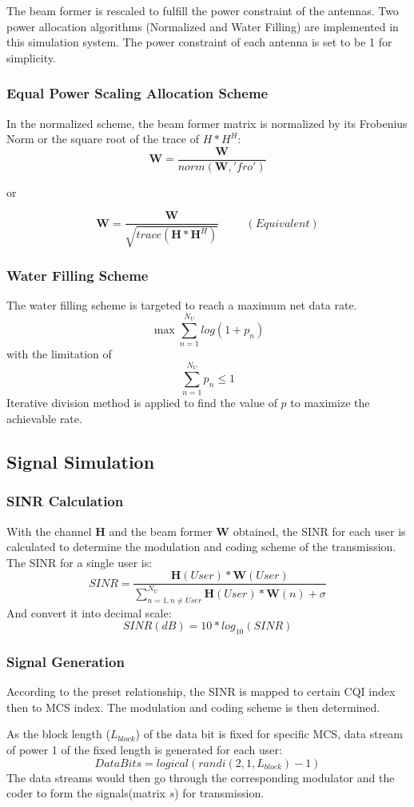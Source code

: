 \documentclass{article}
\begin{document}
The beam former is rescaled to fulfill the power constraint of the antennas. Two power allocation algorithms (Normalized and Water Filling) are implemented in this simulation system.
The power constraint of each antenna is set to be 1 for simplicity.
\subsubsection{Equal Power Scaling Allocation Scheme}
In the normalized scheme, the beam former matrix is normalized by its Frobenius Norm or the square root of the trace of $H*H^H$:
$$
\textbf{W} = \frac{\textbf{W}}{norm(\textbf{W}, 'fro')}
$$
\begin{center}or\end{center}
$$
\textbf{W} = \frac{\textbf{W}}{\sqrt{trace(\textbf{H}*\textbf{H}^H)}}   \hspace{1cm}(Equivalent)
$$
\subsubsection{Water Filling Scheme}
The water filling scheme is targeted to reach a maximum net data rate.
$$
\max \sum_{n=1}^{N_U} log(1+p_n)
$$
with the limitation of
$$\sum_{n=1}^{N_U} p_n \leq 1$$
Iterative division method is applied to find the value of $p$ to maximize the achievable rate.

\subsection{Signal Simulation}
\subsubsection{SINR Calculation}
With the channel \textbf{H} and the beam former \textbf{W} obtained, the SINR for each user is calculated to determine the modulation and coding scheme of the transmission.
The SINR for a single user is:
$$
SINR = \frac{\textbf{H}(User)*\textbf{W}(User)}{\sum_{n=1,n\ne User}^{N_U} \textbf{H}(User)*\textbf{W}(n)+\sigma}
$$
And convert it into decimal scale:
$$SINR(dB) = 10*log_10(SINR)$$
\subsubsection{Signal Generation}
According to the preset relationship, the SINR is mapped to certain CQI index then to MCS index.
The modulation and coding scheme is then determined.

As the block length ($L_{block}$) of the data bit is fixed for specific MCS, data stream of power 1 of the fixed length is generated for each user:
$$DataBits = logical(randi(2,1,L_{block})-1)$$
The data streams would then go through the corresponding modulator and the coder to form the signals(matrix $s$) for transmission.
\end{document}
